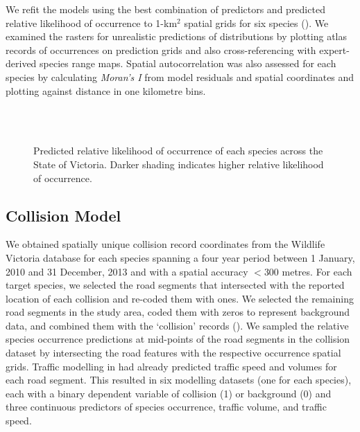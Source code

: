 We refit the models using the best combination of predictors and predicted relative likelihood of occurrence to 1-km$^2$ spatial grids for six species (). We examined the rasters for unrealistic predictions of distributions by plotting atlas records of occurrences on prediction grids and also cross-referencing with expert-derived species range maps. Spatial autocorrelation was also assessed for each species by calculating \textit{Moran's I} from model residuals and spatial coordinates and plotting against distance in one kilometre bins.

\begin{figure*}[!t]
  \centering
  \\
  \\  
  \caption[Predicted relative likelihood of six mammal species occurrence in Victoria]{Predicted relative likelihood of occurrence of each species across the State of Victoria. Darker shading indicates higher relative likelihood of occurrence.}
  \label{6sp_occ_preds}
\end{figure*}

\subsection{Collision Model}

We obtained spatially unique collision record coordinates from the Wildlife Victoria database for each species spanning a four year period between 1 January, 2010 and 31 December, 2013 and with a spatial accuracy $<$300 metres. For each target species, we selected the road segments that intersected with the reported location of each collision and re-coded them with ones.  We selected the remaining road segments in the study area, coded them with zeros to represent background data, and combined them with the `collision' records ().  We sampled the relative species occurrence predictions at mid-points of the road segments in the collision dataset by intersecting the road features with the respective occurrence spatial grids.  Traffic modelling in  had already predicted traffic speed and volumes for each road segment.  This resulted in six modelling datasets (one for each species), each with a binary dependent variable of collision (1) or background (0) and three continuous predictors of species occurrence, traffic volume, and traffic speed.

